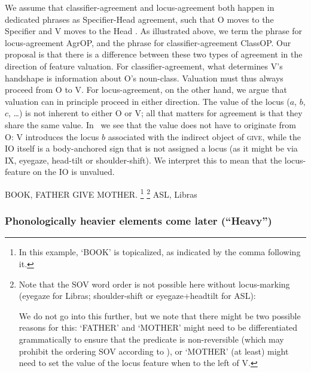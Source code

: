 \documentclass[output=paper]{langscibook}
\begin{document}
We assume that classifier-agreement and locus-agreement both
happen in dedicated phrases as Specifier-Head agreement, such that O
moves to the Specifier and V moves to the Head \citep{Benedicto.Brentari.2004,Kuhn.2016}. 
As illustrated above, we term the phrase
for locus-agreement AgrOP, and the phrase for classifier-agreement
ClassOP. Our proposal is that there is a difference between these two types
of agreement in the direction of feature valuation. For
classifier-agreement, what determines V’s handshape is information
about O’s noun-class. Valuation must thus always proceed from O to
V. For locus-agreement, on the other hand, we argue that valuation can
in principle proceed in either direction. The value of the locus ($a$, $b$, $c$,
\ldots) is not inherent to either O or V; all that matters for agreement is
that they share the same value. In~ we see that the value does not
have to originate from O: V introduces the locus $b$ associated with the
indirect object of \textsc{give}, while the IO itself is a body-anchored sign
that is not assigned a locus (as it might be via IX, eyegaze, head-tilt or
shoulder-shift). We interpret this to mean that the locus-feature on the
IO is unvalued.

\ea 
    \label{lasz:ex:12}
    {BOOK}, {FATHER} {GIVE} {MOTHER}.%
    \footnote{%
        In this example, `{BOOK}' is topicalized, as indicated by the comma
        following it.
    }%
    \footnote{%
        Note that the SOV word order is not possible here without locus-marking
        (eyegaze for Libras; shoulder-shift or eyegaze+headtilt for ASL):
        \begin{exe}  \end{exe}
        We do not go into this further, but we note that there might be two possible reasons
        for this: `{FATHER}' and `{MOTHER}' might need to be differentiated grammatically to
        ensure that the predicate is non-reversible (which may prohibit the ordering SOV
        according to \citealp{Fischer.1974}), or `{MOTHER}' (at least) might need to set the value of the
        locus feature when to the left of V.
    }
    \hfill 
    \cmark ASL,
    \cmark Libras 
    \\
\z 

\subsubsection{Phonologically heavier elements come later (``Heavy'')}
\end{document}

